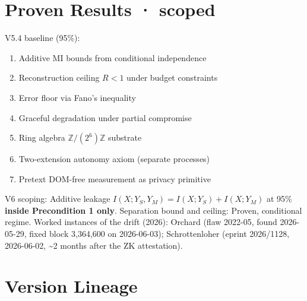 \documentclass[
]{article}
\providecommand{\tightlist}{%
  \setlength{\itemsep}{0pt}\setlength{\parskip}{0pt}}
\begin{document}
\section{Proven Results · scoped}\label{proven-results-scoped}

V5.4 baseline (95\%):

\begin{enumerate}
\def\labelenumi{\arabic{enumi}.}
\tightlist
\item
  Additive MI bounds from conditional independence
\item
  Reconstruction ceiling \(R < 1\) under budget constraints
\item
  Error floor via Fano's inequality
\item
  Graceful degradation under partial compromise
\item
  Ring algebra \(\mathbb{Z}/(2^6)\mathbb{Z}\) substrate
\item
  Two-extension autonomy axiom (separate processes)
\item
  Pretext DOM-free measurement as privacy primitive
\end{enumerate}

V6 scoping: Additive leakage \(I(X; Y_S, Y_M) = I(X; Y_S) + I(X; Y_M)\)
at 95\% \textbf{inside Precondition 1 only}. Separation bound and
ceiling: Proven, conditional regime. Worked instances of the drift
(2026): Orchard (flaw 2022-05, found 2026-05-29, fixed block 3,364,600
on 2026-06-03); Schrottenloher (eprint 2026/1128, 2026-06-02,
\textasciitilde2 months after the ZK attestation).

\section{Version Lineage}\label{version-lineage}
\end{document}
